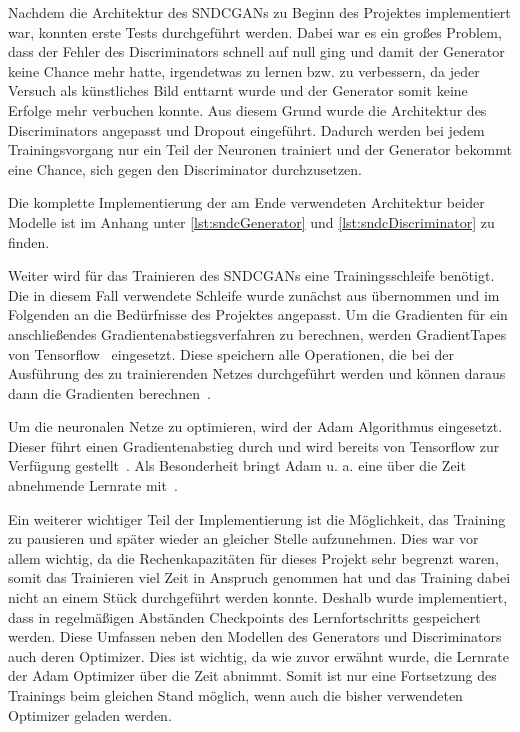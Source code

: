  Nachdem die Architektur des SNDCGANs zu Beginn des Projektes implementiert war,
 konnten erste Tests durchgeführt werden. Dabei war es ein großes Problem, dass
 der Fehler des Discriminators schnell auf null ging und damit der Generator
 keine Chance mehr hatte, irgendetwas zu lernen bzw. zu verbessern, da jeder
 Versuch als künstliches Bild enttarnt wurde und der Generator somit keine
 Erfolge mehr verbuchen konnte. Aus diesem Grund wurde die Architektur des
 Discriminators angepasst und Dropout eingeführt. Dadurch werden bei jedem
 Trainingsvorgang nur ein Teil der Neuronen trainiert und der Generator bekommt
 eine Chance, sich gegen den Discriminator durchzusetzen.
 
 Die komplette Implementierung der am Ende verwendeten Architektur beider
 Modelle ist im Anhang unter \autoref{lst:sndcGenerator} und
 \ref{lst:sndcDiscriminator} zu finden.
 
 Weiter wird für das Trainieren des SNDCGANs eine Trainingsschleife benötigt.
 Die in diesem Fall verwendete Schleife wurde zunächst aus \cite{raschka2019}
 übernommen und im Folgenden an die Bedürfnisse des Projektes angepasst. Um die
 Gradienten für ein anschließendes Gradientenabstiegsverfahren zu berechnen,
 werden GradientTapes von Tensorflow~\cite{tf:gradientape} eingesetzt. Diese
 speichern alle Operationen, die bei der Ausführung des zu trainierenden Netzes
 durchgeführt werden und können daraus dann die Gradienten
 berechnen~\cite{tf:autodiff}.
 
 Um die neuronalen Netze zu optimieren, wird der Adam Algorithmus eingesetzt.
 Dieser führt einen Gradientenabstieg durch und wird bereits von Tensorflow zur
 Verfügung gestellt~\cite{tf:adam}. Als Besonderheit bringt Adam u. a. eine über
 die Zeit abnehmende Lernrate mit~\cite{kingma2014}.
 
 Ein weiterer wichtiger Teil der Implementierung ist die Möglichkeit, das
 Training zu pausieren und später wieder an gleicher Stelle aufzunehmen. Dies
 war vor allem wichtig, da die Rechenkapazitäten für dieses Projekt sehr
 begrenzt waren, somit das Trainieren viel Zeit in Anspruch genommen hat und das
 Training dabei nicht an einem Stück durchgeführt werden konnte. Deshalb wurde
 implementiert, dass in regelmäßigen Abständen Checkpoints des Lernfortschritts
 gespeichert werden. Diese Umfassen neben den Modellen des Generators und
 Discriminators auch deren Optimizer. Dies ist wichtig, da wie zuvor erwähnt
 wurde, die Lernrate der Adam Optimizer über die Zeit abnimmt. Somit ist nur
 eine Fortsetzung des Trainings beim gleichen Stand möglich, wenn auch die
 bisher verwendeten Optimizer geladen werden. 
 
